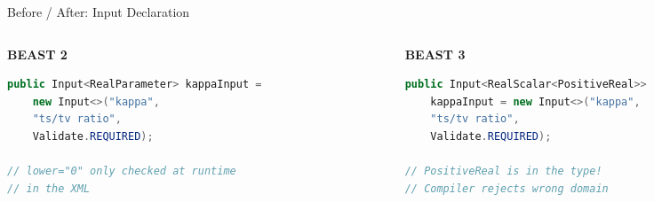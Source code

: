 \documentclass[aspectratio=169,11pt]{beamer}
\begin{document}
\begin{frame}[fragile]{Before / After: Input Declaration}
\begin{columns}[T]
\begin{column}{0.48\textwidth}
\textbf{BEAST 2}
\begin{lstlisting}[language=Java]
public Input<RealParameter> kappaInput =
    new Input<>("kappa",
    "ts/tv ratio",
    Validate.REQUIRED);

// lower="0" only checked at runtime
// in the XML
\end{lstlisting}
\end{column}
\begin{column}{0.48\textwidth}
\textbf{BEAST 3}
\begin{lstlisting}[language=Java]
public Input<RealScalar<PositiveReal>>
    kappaInput = new Input<>("kappa",
    "ts/tv ratio",
    Validate.REQUIRED);

// PositiveReal is in the type!
// Compiler rejects wrong domain
\end{lstlisting}
\end{column}
\end{columns}
\end{frame}

\end{document}
